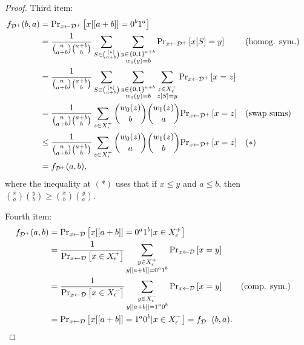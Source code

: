\begin{proof}
Third item:
    \begin{align*}
        f_{\mathcal{D}^+}(b, a) & = \text{Pr}_{x \leftarrow \mathcal{D}^+}\left[x[[a+b]] = 0^b1^a\right] \\
        & = \frac{1}{\binom{n}{a+b}\binom{a+b}{b}} \sum_{S \in \binom{[n]}{a+b}} 
        \sum_{\substack{y \in \{0, 1\}^{a+b}\\w_0(y)=b}} 
        \text{Pr}_{x \leftarrow \mathcal{D}^+}\left[x[S] = y\right]
        && (\text{homog. sym.}) \\
        & = \frac{1}{\binom{n}{a+b}\binom{a+b}{b}} 
        \sum_{S \in \binom{[n]}{a+b}} 
        \sum_{\substack{y \in \{0, 1\}^{a+b}\\w_0(y)=b}} 
        \sum_{\substack{z\in X^+_\epsilon\\z[S]=y}} \text{Pr}_{x \leftarrow \mathcal{D}^+}\left[x = z\right] \\
        & = \frac{1}{\binom{n}{a+b}\binom{a+b}{b}}
        \sum_{z \in X^+_\epsilon} \binom{w_0(z)}{b} \binom{w_1(z)}{a} \text{Pr}_{x \leftarrow \mathcal{D}^+}\left[x = z\right]
        && (\text{swap sums}) \\
        & \leq \frac{1}{\binom{n}{a+b}\binom{a+b}{b}}
        \sum_{z \in X^+_\epsilon} \binom{w_0(z)}{a} \binom{w_1(z)}{b} \text{Pr}_{x \leftarrow \mathcal{D}^+}\left[x = z\right]
        && (*) \\
        & = f_{\mathcal{D}^+}(a,b),
    \end{align*}
    where the inequality at $(*)$ uses that if $x \leq y$ and $a \leq b$, then 
    $\binom{x}{a} \binom{y}{b} \geq \binom{x}{b} \binom{y}{a}$.

Fourth item:
\begin{align*}
    f_{\mathcal{D}^+}(a, b) & = \text{Pr}_{x \leftarrow \mathcal{D}}\left[x[[a+b]] = 0^a1^b | x \in X^+_\epsilon\right] \\
    & = \frac{1}{\text{Pr}_{x \leftarrow \mathcal{D}}\left[x \in X^+_\epsilon\right]}
    \sum_{\substack{y \in X^+_\epsilon\\y[[a+b]] = 0^a1^b}} \text{Pr}_{x \leftarrow \mathcal{D}}\left[x = y\right] \\
    & = \frac{1}{\text{Pr}_{x \leftarrow \mathcal{D}}\left[x \in X^-_\epsilon\right]}
    \sum_{\substack{y \in X^-_\epsilon\\y[[a+b]] = 1^a0^b}} \text{Pr}_{x \leftarrow \mathcal{D}}\left[x = y\right] 
    && (\text{comp. sym.})\\
    & = \text{Pr}_{x \leftarrow \mathcal{D}}\left[x[[a+b]] = 1^a0^b | x \in X^-_\epsilon\right] = f_{\mathcal{D}^-}(b, a).
\end{align*}


\end{proof}




